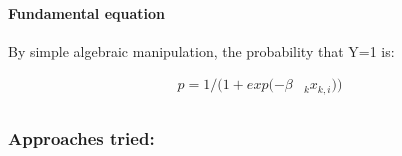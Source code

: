 \documentclass[11pt]{article}
\begin{document}
    \paragraph{Fundamental equation}\label{fundamental-equation}

    By simple algebraic manipulation, the probability that Y=1 is:

    \begin{align}
p = 1 / (1 + exp (-{\beta} & _k x _{k,i})  )            \\
\end{align}

    \subsubsection{Approaches tried:}\label{approaches-tried}
\end{document}
